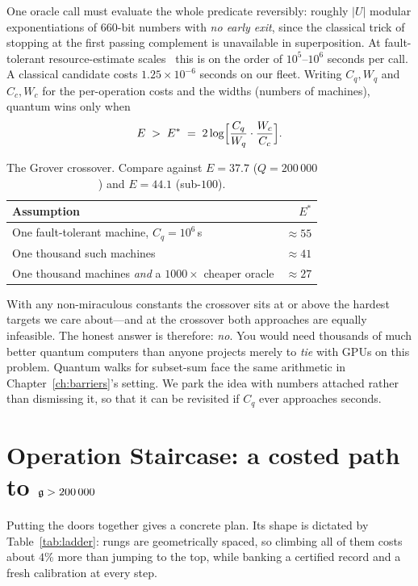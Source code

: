 One oracle call must evaluate the whole predicate reversibly: roughly $|U|$
modular exponentiations of $660$-bit numbers with \emph{no early exit}, since
the classical trick of stopping at the first passing complement is unavailable
in superposition. At fault-tolerant resource-estimate
scales~\cite{GidneyEkera} this is on the order of $10^{5}$--$10^{6}$ seconds per
call. A classical candidate costs $1.25\times10^{-6}$ seconds on our fleet.
Writing $C_q,W_q$ and $C_c,W_c$ for the per-operation costs and the widths
(numbers of machines), quantum wins only when
\[
E\;>\;E^{*}\;=\;2\log\Bigl[\frac{C_q}{W_q}\cdot\frac{W_c}{C_c}\Bigr].
\]

\begin{table}[h]
\centering\small
\caption{The Grover crossover. Compare against $E=37.7$ ($Q=200\,000$) and
$E=44.1$ (sub-$100$).}\label{tab:quantum}
\begin{tabular}{lr}
\toprule
Assumption & $E^{*}$\\
\midrule
One fault-tolerant machine, $C_q=10^{6}$\,s & $\approx55$\\
One thousand such machines & $\approx41$\\
One thousand machines \emph{and} a $1000\times$ cheaper oracle & $\approx27$\\
\bottomrule
\end{tabular}
\end{table}

With any non-miraculous constants the crossover sits at or above the hardest
targets we care about---and at the crossover both approaches are equally
infeasible. The honest answer is therefore: \emph{no}. You would need thousands
of much better quantum computers than anyone projects merely to \emph{tie} with
GPUs on this problem. Quantum walks for subset-sum face the same arithmetic in
Chapter~\ref{ch:barriers}'s setting. We park the idea with numbers attached
rather than dismissing it, so that it can be revisited if $C_q$ ever approaches
seconds.

\section{Operation Staircase: a costed path to \texorpdfstring{$\mathfrak{g}>200\,000$}{g > 200000}}

Putting the doors together gives a concrete plan. Its shape is dictated by
Table~\ref{tab:ladder}: rungs are geometrically spaced, so climbing all of them
costs about $4\%$ more than jumping to the top, while banking a certified record
and a fresh calibration at every step.

